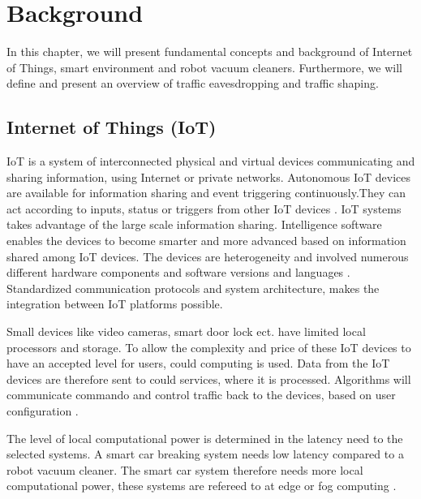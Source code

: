 \chapter{Background}
In this chapter, we will present fundamental concepts and background of Internet of Things, smart environment and robot vacuum cleaners. Furthermore, we will define and present an overview of traffic eavesdropping and traffic shaping. 

\section{Internet of Things (IoT)}
IoT is a system of interconnected physical and virtual devices communicating and sharing information, using Internet or private networks. Autonomous IoT devices are available for information sharing and event triggering continuously.They can act according to inputs, status or triggers from other IoT devices \cite{atlam2020iot}. IoT systems takes advantage of the large scale information sharing. Intelligence software enables the devices to become smarter and more advanced based on information shared among IoT devices. The devices are heterogeneity and involved numerous different hardware components and software versions and languages \cite{atlam2020iot}. Standardized communication protocols and system architecture, makes the integration between IoT platforms possible. 

Small devices like video cameras, smart door lock ect. have limited local processors and storage. To allow the complexity and price of these IoT devices to have an accepted level for users, could computing is used. Data from the IoT devices are therefore sent to could services, where it is processed. Algorithms will communicate commando and control traffic back to the devices, based on user configuration \cite{pavelic2018internet}. 

The level of local computational power is determined in the latency need to the selected systems. A smart car breaking system needs low latency compared to a robot vacuum cleaner. The smart car system therefore needs more local computational power, these systems are refereed to at edge or fog computing \cite{mocrii2018iot}.  


